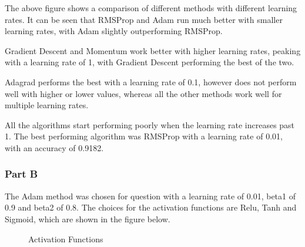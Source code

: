 The above figure shows a comparison of different methods with different learning rates.
It can be seen that RMSProp and Adam run much better with smaller learning rates, with Adam slightly outperforming RMSProp.

Gradient Descent and Momentum work better with higher learning rates, peaking with a learning rate of 1, with Gradient Descent performing the best of the two.

Adagrad performs the best with a learning rate of 0.1, however does not perform well with higher or lower values, whereas all the other methods work well for multiple learning rates.

All the algorithms start performing poorly when the learning rate increases past 1. The best performing algorithm was RMSProp with a learning rate of 0.01, with an accuracy of 0.9182.

\subsubsection*{Part B}

The Adam method was chosen for question with a learning rate of 0.01, beta1 of 0.9 and beta2 of 0.8.
The choices for the activation functions are Relu, Tanh and Sigmoid, which are shown in the figure below.

\begin{figure}[H]%
    \centering
    \qquad
    \qquad
    \caption{Activation Functions}%
\end{figure}

